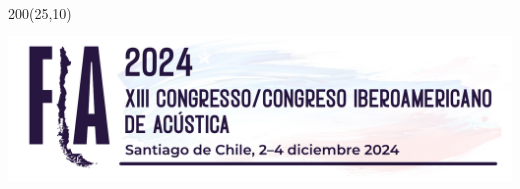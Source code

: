 \pagestyle{plain}
\thispagestyle{firststyle}
\begin{textblock}{200}(25,10)
\includegraphics[height=45mm,page=1]{FIA2024_logo.pdf}
\end{textblock}

